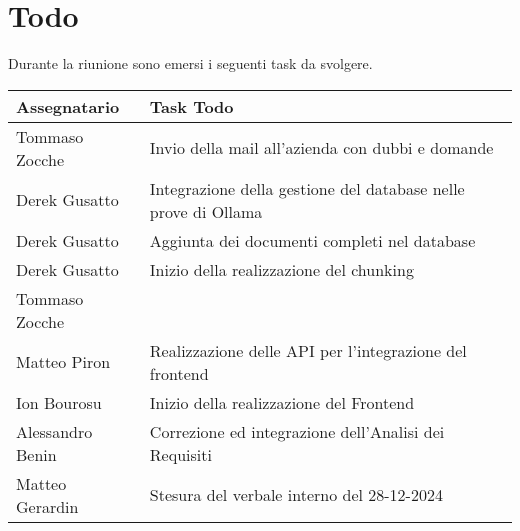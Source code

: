 \section{Todo}
Durante la riunione sono emersi i seguenti task da svolgere.

\begin{center}
  \begin{tabular}{|L{5cm}|L{8cm}|}
    \hline
    \textbf{Assegnatario} & \textbf{Task Todo} \\ \hline
    Tommaso Zocche & Invio della mail all'azienda con dubbi e domande \\ \hline
    Derek Gusatto & Integrazione della gestione del database nelle prove di Ollama \\ \hline
    Derek Gusatto & Aggiunta dei documenti completi nel database \\ \hline
    Derek Gusatto & Inizio della realizzazione del chunking \\ Tommaso Zocche & \\ \hline
    Matteo Piron & Realizzazione delle API per l’integrazione del frontend \\ \hline
    Ion Bourosu & Inizio della realizzazione del Frontend \\ \hline
    Alessandro Benin & Correzione ed integrazione dell'Analisi dei Requisiti \\ \hline
    Matteo Gerardin & Stesura del verbale interno del 28-12-2024 \\ \hline
  \end{tabular}
\end{center}